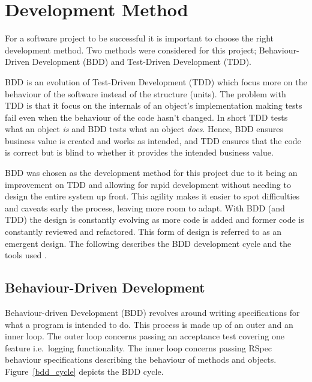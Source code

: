 \section{Development Method} %
\label{sec:development}
For a software project to be successful it is important to choose the right
development method. Two methods were considered for this project;
Behaviour-Driven Development (BDD) and Test-Driven Development (TDD).

BDD is an evolution of Test-Driven Development (TDD) which focus more on the
behaviour of the software instead of the structure (units). The problem with
TDD is that it focus on the internals of an object's implementation making
tests fail even when the behaviour of the code hasn't changed. In short TDD
tests what an object \textit{is} and BDD tests what an object
\textit{does}\cite{rspecbook}. Hence, BDD ensures business value is created and
works as intended, and TDD ensures that the code is correct but is blind to
whether it provides the intended business value.

BDD was chosen as the development method for this project due to it being an
improvement on TDD and allowing for rapid development without needing to
design the entire system up front. This agility makes it easier to spot
difficulties and caveats early the process, leaving more room to adapt. With
BDD (and TDD) the design is constantly evolving as more code is added and
former code is constantly reviewed and refactored. This form of design is
referred to as an emergent design. The following describes the BDD development
cycle and the tools used \cite{bddintro}.

\subsection{Behaviour-Driven Development}
Behaviour-driven Development (BDD) revolves around writing specifications for
what a program is intended to do. This process is made up of an outer and an
inner loop. The outer loop concerns passing an acceptance test covering one
feature i.e.\ logging functionality. The inner loop concerns passing RSpec
behaviour specifications describing the behaviour of methods and objects.
Figure~\ref{bdd_cycle} depicts the BDD cycle.

